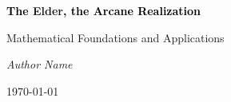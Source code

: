 \documentclass[11pt,twoside,openright]{book}
\begin{document}
\frontmatter

\begin{titlepage}
    \centering
    \vspace*{2cm}
    {\Huge\bfseries \textrm{\textcolor{black}{The }}\textcolor{DarkSkyBlue}{Elder}\textrm{\textcolor{black}{, the Arcane Realization}}\par}
    \vspace{2cm}
    {\Large Mathematical Foundations and Applications\par}
    \vspace{4cm}
    {\Large\itshape Author Name\par}
    \vfill
    {\large \today\par}
\end{titlepage}

\tableofcontents
\listoffigures
\listoftables
\listofalgorithms
\listoftheorems

\mainmatter



\backmatter

\printbibliography[title=References]

\printindex
\end{document}
